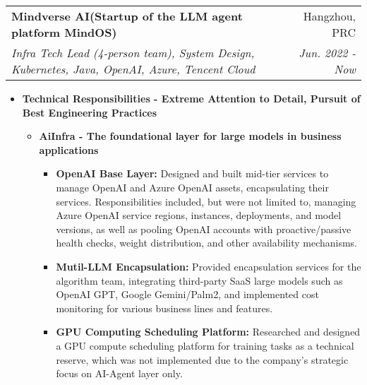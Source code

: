 \documentclass[letterpaper,11pt]{article}
\makeatletter
\newcommand{\resumeSubheading}[4]{
	\vspace{-1pt}\item
	\begin{tabular*}{0.97\textwidth}[t]{l@{\extracolsep{\fill}}r}
		\textbf{#1} & #2 \\
		\textit{\small#3} & \textit{\small #4} \\
	\end{tabular*}\vspace{-5pt}
}
\makeatother
\begin{document}
\begin{spacing}{1.0}
	\resumeSubheading
	{Mindverse AI(Startup of the LLM agent platform MindOS)}{Hangzhou, PRC}
	{Infra Tech Lead (4-person team), System Design, Kubernetes, Java, OpenAI, Azure, Tencent Cloud}{Jun. 2022 - Now}
	\begin{itemize}
		\item \textbf{Technical Responsibilities - Extreme Attention to Detail, Pursuit of Best Engineering Practices}
		\begin{itemize}
			\item \textbf{AiInfra - The foundational layer for large models in business applications}
			\begin{itemize}
				\item \textbf{OpenAI Base Layer: }Designed and built mid-tier services to manage OpenAI and Azure OpenAI assets, encapsulating their services. Responsibilities included, but were not limited to, managing Azure OpenAI service regions, instances, deployments, and model versions, as well as pooling OpenAI accounts with proactive/passive health checks, weight distribution, and other availability mechanisms.
				\item \textbf{Mutil-LLM Encapsulation: }Provided encapsulation services for the algorithm team, integrating third-party SaaS large models such as OpenAI GPT, Google Gemini/Palm2, and implemented cost monitoring for various business lines and features.
				\item \textbf{GPU Computing Scheduling Platform: }Researched and designed a GPU compute scheduling platform for training tasks as a technical reserve, which was not implemented due to the company's strategic focus on AI-Agent layer only.
			\end{itemize}
			

\end{itemize}
\end{itemize}
\end{spacing}
\end{document}
